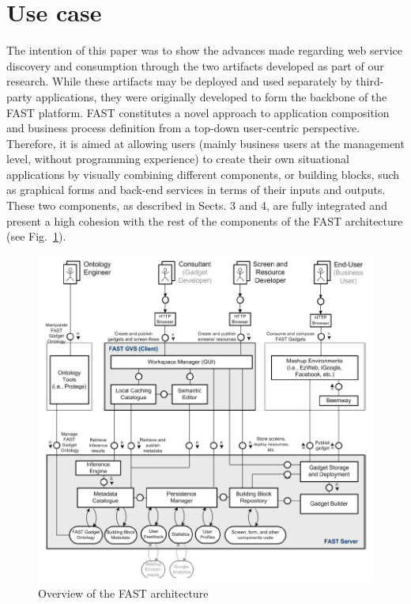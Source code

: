 
\section{Use case}
\label{sec:use_case}

The intention of this paper was to show the advances made regarding web service discovery and consumption through the two artifacts developed as part of our research. While these artifacts may be deployed and used separately by third-party applications, they were originally developed to form the backbone of the FAST platform.
FAST constitutes a novel approach to application composition and business process definition from a top-down user-centric perspective. Therefore, it is aimed at allowing users (mainly business users at the management level, without programming experience) to create their own situational applications by visually combining different components, or building blocks, such as graphical forms and back-end services in terms of their inputs and outputs. These two components, as described in Sects. 3 and 4, are fully integrated and present a high cohesion with the rest of the components of the FAST architecture (see Fig.~\ref{fig:fast_architecture}). 

\begin{figure}[ht]
  \begin{center}
    \includegraphics[width=.9\linewidth]{images/fast_architecture.png}
    \caption{Overview of the FAST architecture}
    \label{fig:fast_architecture}
  \end{center}
\end{figure}


